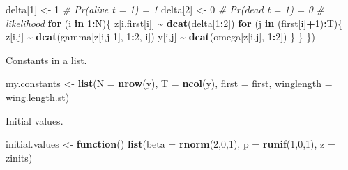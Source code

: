 \documentclass[
  12pt,
]{krantz}
\newenvironment{Shaded}{\begin{snugshade}}{\end{snugshade}}
\newcommand{\AttributeTok}[1]{\textcolor[rgb]{0.13,0.29,0.53}{#1}}
\newcommand{\CommentTok}[1]{\textcolor[rgb]{0.56,0.35,0.01}{\textit{#1}}}
\newcommand{\ControlFlowTok}[1]{\textcolor[rgb]{0.13,0.29,0.53}{\textbf{#1}}}
\newcommand{\DecValTok}[1]{\textcolor[rgb]{0.00,0.00,0.81}{#1}}
\newcommand{\FunctionTok}[1]{\textcolor[rgb]{0.13,0.29,0.53}{\textbf{#1}}}
\newcommand{\NormalTok}[1]{#1}
\newcommand{\OtherTok}[1]{\textcolor[rgb]{0.56,0.35,0.01}{#1}}
\newcommand{\SpecialCharTok}[1]{\textcolor[rgb]{0.81,0.36,0.00}{\textbf{#1}}}
\begin{document}
\begin{Shaded}
\begin{Highlighting}[]
\NormalTok{  delta[}\DecValTok{1}\NormalTok{] }\OtherTok{\textless{}{-}} \DecValTok{1}          \CommentTok{\# Pr(alive t = 1) = 1}
\NormalTok{  delta[}\DecValTok{2}\NormalTok{] }\OtherTok{\textless{}{-}} \DecValTok{0}          \CommentTok{\# Pr(dead t = 1) = 0}
  \CommentTok{\# likelihood}
  \ControlFlowTok{for}\NormalTok{ (i }\ControlFlowTok{in} \DecValTok{1}\SpecialCharTok{:}\NormalTok{N)\{}
\NormalTok{    z[i,first[i]] }\SpecialCharTok{\textasciitilde{}} \FunctionTok{dcat}\NormalTok{(delta[}\DecValTok{1}\SpecialCharTok{:}\DecValTok{2}\NormalTok{])}
    \ControlFlowTok{for}\NormalTok{ (j }\ControlFlowTok{in}\NormalTok{ (first[i]}\SpecialCharTok{+}\DecValTok{1}\NormalTok{)}\SpecialCharTok{:}\NormalTok{T)\{}
\NormalTok{      z[i,j] }\SpecialCharTok{\textasciitilde{}} \FunctionTok{dcat}\NormalTok{(gamma[z[i,j}\DecValTok{{-}1}\NormalTok{], }\DecValTok{1}\SpecialCharTok{:}\DecValTok{2}\NormalTok{, i])}
\NormalTok{      y[i,j] }\SpecialCharTok{\textasciitilde{}} \FunctionTok{dcat}\NormalTok{(omega[z[i,j], }\DecValTok{1}\SpecialCharTok{:}\DecValTok{2}\NormalTok{])}
\NormalTok{    \}}
\NormalTok{  \}}
\NormalTok{\})}
\end{Highlighting}
\end{Shaded}

Constants in a list.

\begin{Shaded}
\begin{Highlighting}[]
\NormalTok{my.constants }\OtherTok{\textless{}{-}} \FunctionTok{list}\NormalTok{(}\AttributeTok{N =} \FunctionTok{nrow}\NormalTok{(y), }
                     \AttributeTok{T =} \FunctionTok{ncol}\NormalTok{(y), }
                     \AttributeTok{first =}\NormalTok{ first,}
                     \AttributeTok{winglength =}\NormalTok{ wing.length.st)}
\end{Highlighting}
\end{Shaded}

Initial values.

\begin{Shaded}
\begin{Highlighting}[]
\NormalTok{initial.values }\OtherTok{\textless{}{-}} \ControlFlowTok{function}\NormalTok{() }\FunctionTok{list}\NormalTok{(}\AttributeTok{beta =} \FunctionTok{rnorm}\NormalTok{(}\DecValTok{2}\NormalTok{,}\DecValTok{0}\NormalTok{,}\DecValTok{1}\NormalTok{),}
                                  \AttributeTok{p =} \FunctionTok{runif}\NormalTok{(}\DecValTok{1}\NormalTok{,}\DecValTok{0}\NormalTok{,}\DecValTok{1}\NormalTok{),}
                                  \AttributeTok{z =}\NormalTok{ zinits)}
\end{Highlighting}
\end{Shaded}
\end{document}
